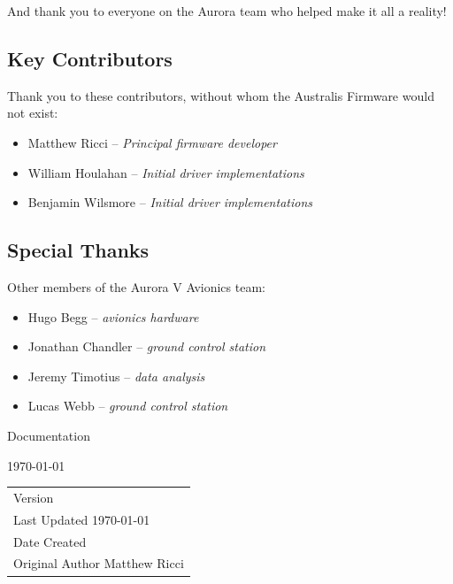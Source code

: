 \documentclass[a4paper, oneside, british]{memoir}
\makeatletter
\newcommand{\docname}{}
\newcommand{\sysname}{}
\newcommand{\orglabel}{}
\newlength{\margindedent}
\numberwithin{figure}{section}
\newcommand*{\titleAM}[2]%
{\begingroup
  \centering
  {\Huge #1 Documentation}\par\vspace{1em}
  {\huge #2}\par\vspace{1em}
  {\small {\DTMsetdatestyle{yearonly}\today} \orglabel}\par
  \endgroup}
\newcommand*{\documentInfo}[2]%
{\begingroup
  \centering
  \begin{table}[h]
  \centering
  \begin{tabularx}{0.5\textwidth}{@{}X@{}}
    Version         \dotfill #1            \\
    Last Updated    \dotfill \today        \\
    Date Created    \dotfill #2            \\
    Original Author \dotfill Matthew Ricci 
  \end{tabularx}
  \end{table}
  \endgroup}
\makeatother
\begin{document}
  And thank you to everyone on the Aurora team who helped make it all a reality!

  \subsection*{\hspace{-\margindedent}Key Contributors}
  Thank you to these contributors, without whom the Australis Firmware would not exist:
  \vspace{-0.5em}
  \begin{itemize}
    \setlength{\itemindent}{2em}
    \item Matthew Ricci     -- \textit{Principal firmware developer}
    \item William Houlahan  -- \textit{Initial driver implementations}
    \item Benjamin Wilsmore -- \textit{Initial driver implementations}
  \end{itemize}

  \subsection*{\hspace{-\margindedent}Special Thanks}
  Other members of the Aurora V Avionics team:
  \vspace{-0.5em}
  \begin{itemize}[]
    \setlength{\itemindent}{2em}
    \item Hugo Begg -- \textit{avionics hardware}
    \item Jonathan Chandler -- \textit{ground control station}
    \item Jeremy Timotius -- \textit{data analysis}
    \item Lucas Webb -- \textit{ground control station}
  \end{itemize}

  \clearpage


  
  \vspace*{\fill}
  
  \titleAM{\sysname}{\docname}
  \documentInfo{1.0}{\DTMdate{2025-03-16}}

  \vspace*{\fill}
  
\end{document}
